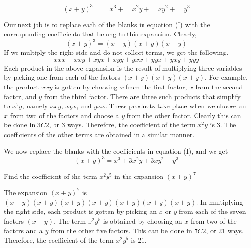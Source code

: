 \[
    (x+y)^3 = \underbar{~~~~~}x^3 + \underbar{~~~~~}x^2y + \underbar{~~~~~}xy^2 + \underbar{~~~~~}y^3 \tag{I}
\]

Our next job is to replace each of the blanks in equation (I) with the corresponding coefficients that belong to this expansion. Clearly,
\[
    (x+y)^3= (x+y)(x+y)(x+y)
\]
If we multiply the right side and do not collect terms, we get the following.
\[
    xxx + xxy + xyx + xyy + yxx + yyx + yxy + yyy
\]
Each product in the above expansion is the result of multiplying three variables by picking one from each of the factors \((x+y)(x+y)(x+y)\). For example, the product \(xxy\) is gotten by choosing \(x\) from the first factor, \(x\) from the second factor, and \(y\) from the third factor. There are three such products that simplify to \(x^2y\), namely \(xxy\), \(xyx\), and \(yxx\). These products take place when we choose an \(x\) from two of the factors and choose a \(y\) from the other factor. Clearly this can be done in \(3C2\), or \(3\) ways. Therefore, the coefficient of the term \(x^2y\) is \(3\). The coefficients of the other terms are obtained in a similar manner.

We now replace the blanks with the coefficients in equation (I), and we get
\[
    (x+y)^3= x^3+3x^2y+3xy^2+y^3
\]

\begin{example}
    Find the coefficient of the term \( x^2y^5 \) in the expansion \( (x + y)^7 \).
\end{example}
\begin{solution}
    The expansion \( (x + y)^7 \) is \( (x + y)(x + y)(x + y)(x + y)(x + y)(x + y)(x + y) \).
    In multiplying the right side, each product is gotten by picking an \( x \) or \( y \) from each of the seven factors \( (x + y) \).
    The term \( x^2y^5 \) is obtained by choosing an \( x \) from two of the factors and a \( y \) from the other five factors. This can be done in \( 7C2 \), or 21 ways.
    Therefore, the coefficient of the term \( x^2y^5 \) is 21.
\end{solution}

